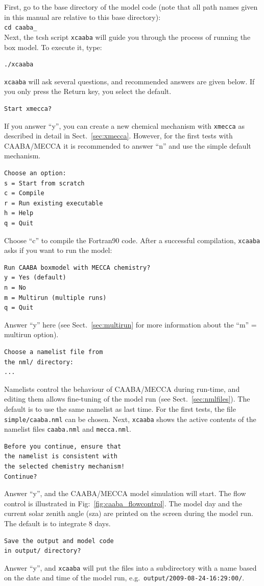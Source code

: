 \documentclass[twoside]{article}
\begin{document}
First, go to the base directory of the model code (note that all path
names given in this manual are relative to this base directory):\\[2mm]
{\tt cd caaba\_\meccaversion}\\[2mm]
Next, the tcsh script \verb|xcaaba| will guide you through the process
of running the box model. To execute it, type:
\begin{verbatim}
./xcaaba
\end{verbatim}
\verb|xcaaba| will ask several questions, and recommended answers are
given below. If you only press the Return key, you select the default.
\begin{verbatim}
Start xmecca?
\end{verbatim}
If you answer ``y'', you can create a new chemical mechanism with
\verb|xmecca| as described in detail in Sect.~\ref{sec:xmecca}. However,
for the first tests with CAABA/MECCA it is recommended to answer ``n''
and use the simple default mechanism.
\begin{verbatim}
Choose an option:
s = Start from scratch
c = Compile
r = Run existing executable
h = Help
q = Quit
\end{verbatim}
Choose ``c'' to compile the Fortran90 code. After a successful
compilation, \verb|xcaaba| asks if you want to run the model:
\begin{verbatim}
Run CAABA boxmodel with MECCA chemistry?
y = Yes (default)
n = No
m = Multirun (multiple runs)
q = Quit
\end{verbatim}
Answer ``y'' here (see Sect.~\ref{sec:multirun} for more information
about the ``m'' = multirun option).
\begin{verbatim}
Choose a namelist file from
the nml/ directory:
...
\end{verbatim}
Namelists control the behaviour of CAABA/MECCA during run-time, and
editing them allows fine-tuning of the model run (see
Sect.~\ref{sec:nmlfiles}). The default is to use the same namelist as
last time. For the first tests, the file \verb|simple/caaba.nml| can be
chosen. Next, \verb|xcaaba| shows the active contents of the namelist
files \verb|caaba.nml| and \verb|mecca.nml|.
\begin{verbatim}
Before you continue, ensure that
the namelist is consistent with
the selected chemistry mechanism!
Continue?
\end{verbatim}
Answer ``y'', and the CAABA/MECCA model simulation will start. The flow
control is illustrated in Fig:~\ref{fig:caaba_flowcontrol}. The model
day and the current solar zenith angle (sza) are printed on the screen
during the model run. The default is to integrate 8 days.
\begin{verbatim}
Save the output and model code 
in output/ directory?
\end{verbatim}
Answer ``y'', and \verb|xcaaba| will put the files into a subdirectory
with a name based on the date and time of the model run, e.g.\
\verb|output/2009-08-24-16:29:00/|.
\end{document}
